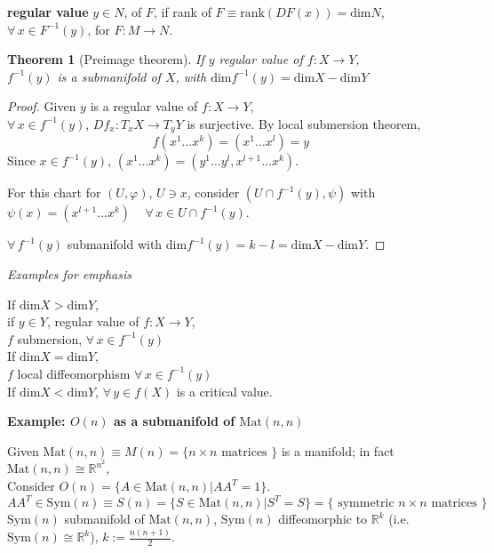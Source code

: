 \documentclass[10pt]{amsart}
\newtheorem{theorem}{Theorem}
\begin{document}
\begin{multicols*}{2}
\textbf{regular value} $y \in N$, of $F$, if rank of $F \equiv \text{rank}(DF(x)) = \text{dim}N$, $\forall \, x \in F^{-1}(y)$, for $F:M\to N$.  


\begin{theorem}[Preimage theorem]
If $y$ regular value of $f:X\to Y$, \\
$f^{-1}(y)$ is a submanifold of $X$, with $\text{dim}f^{-1}(y)=\text{dim}X - \text{dim}Y$
\end{theorem}
\begin{proof}
Given $y$ is a regular value of $f:X\to Y$,  \\
$\forall \, x \in f^{-1}(y)$, $Df_x:T_xX \to T_yY$ is surjective.  By local submersion theorem, 
\[
f(x^1 \dots x^k) = (x^1 \dots x^l)=y
\]	
Since $x\in f^{-1}(y)$, $(x^1\dots x^k)=(y^1 \dots y^l,x^{l+1}\dots x^k)$.  

For this chart for $(U,\varphi)$, $U\ni x$, consider $(U\cap f^{-1}(y),\psi)$ with $\psi(x) = (x^{l+1}\dots x^k) \quad \, \forall \, x\in U\cap f^{-1}(y)$.  

$\forall \, f^{-1}(y)$ submanifold with $\text{dim}f^{-1}(y) = k-l = \text{dim}X-\text{dim}Y$.  
	\end{proof}

\emph{Examples for emphasis}

If $\text{dim}X > \text{dim}Y$, \\
\phantom{\qquad \, } if $y\in Y$, regular value of $f:X\to Y$, \\
\phantom{\qquad \, \qquad \, } $f$ submersion, $\forall \, x \in f^{-1}(y)$ \\
If $\text{dim}X = \text{dim}Y$, \\
\phantom{\qquad \, } $f$ local diffeomorphism $\forall \, x\in f^{-1}(y)$ \\
If $\text{dim}X < \text{dim}Y$, $\forall \, y\in f(X)$ is a critical value.  


\textbf{Example: $O(n)$ as a submanifold of $\text{Mat}(n,n)$}

Given $\text{Mat}(n,n)\equiv M(n) = \lbrace n \times n \text{ matrices } \rbrace$ is a manifold; in fact $\text{Mat}(n,n) \cong \mathbb{R}^{n^2}$, \\
Consider $O(n) = \lbrace A \in \text{Mat}(n,n) | AA^T = 1\rbrace$.  
\begin{equation}
AA^T \in \text{Sym}(n) \equiv S(n) = \lbrace S\in \text{Mat}(n,n) | S^T = S \rbrace = \lbrace \text{ symmetric $n\times n$ matrices } \rbrace
\end{equation}
$\text{Sym}(n)$ submanifold of $\text{Mat}(n,n)$, $\text{Sym}(n)$ diffeomorphic to $\mathbb{R}^k$ (i.e. $\text{Sym}(n) \cong \mathbb{R}^k$), $k:= \frac{n (n+1)}{2}$.  


\end{multicols*}
\end{document}
